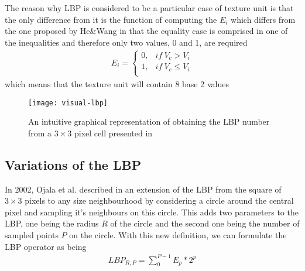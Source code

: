 The reason why LBP is considered to be a particular case of texture unit is that the only difference from it is the function of computing the $E_i$ which differs from the one proposed by He\&Wang in that the equality case is comprised in one of the inequalities and therefore only two values, 0 and 1, are required
\begin{align}
E_i = \begin{cases}
0, & if\ V_c > V_i \\
1, & if\ V_c \leq V_i \\
\end{cases}
\end{align}
which means that the texture unit will contain 8 base 2 values

\begin{figure}[h]
	\begin{center}
		\texttt{[image: visual-lbp]}
	\end{center}
	\caption[Visual representation of \textbf{LBP} computation]{An intuitive graphical representation of obtaining the LBP number from a $3\times3$ pixel cell presented in \cite{lu2014divided}}
\end{figure}

\subsection{Variations of the LBP}
In 2002, Ojala et al. described in \cite{OjalaPM02} an extension of the LBP from the square of $3\times3$ pixels to any size neighbourhood by considering a circle around the central pixel and sampling it's neighbours on this circle. This adds two parameters to the LBP, one being the radius $R$ of the circle and the second one being the number of sampled points $P$ on the circle.  With this new definition, we can formulate the LBP operator as being
\begin{align}
	LBP_{R,P} = \sum_{0}^{P-1}E_p*2^p
\end{align}

